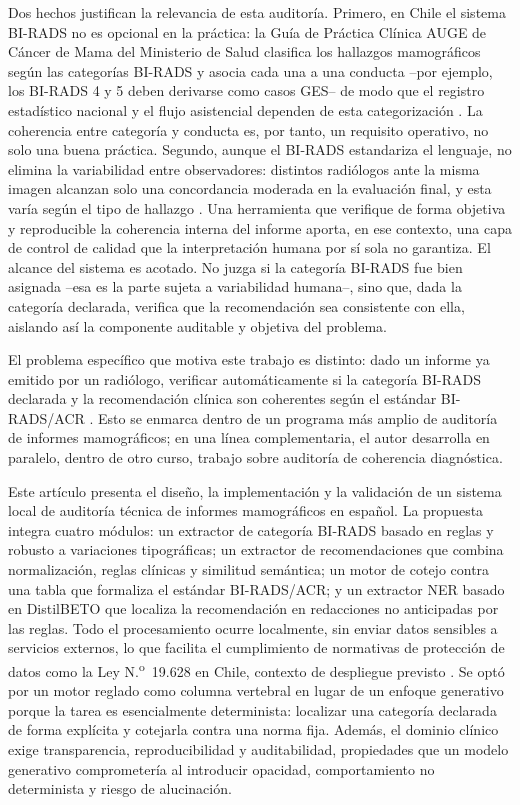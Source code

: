 \documentclass[10pt,journal,a4paper]{IEEEtran}
\begin{document}
Dos hechos justifican la relevancia de esta auditor\'ia. Primero, en Chile el sistema BI-RADS no es opcional en la pr\'actica: la Gu\'ia de Pr\'actica Cl\'inica AUGE de C\'ancer de Mama del Ministerio de Salud clasifica los hallazgos mamogr\'aficos seg\'un las categor\'ias BI-RADS y asocia cada una a una conducta --por ejemplo, los BI-RADS 4 y 5 deben derivarse como casos GES-- de modo que el registro estad\'istico nacional y el flujo asistencial dependen de esta categorizaci\'on \cite{minsal2015gpc}. La coherencia entre categor\'ia y conducta es, por tanto, un requisito operativo, no solo una buena pr\'actica. Segundo, aunque el BI-RADS estandariza el lenguaje, no elimina la variabilidad entre observadores: distintos radi\'ologos ante la misma imagen alcanzan solo una concordancia moderada en la evaluaci\'on final, y esta var\'ia seg\'un el tipo de hallazgo \cite{berg2000birads, lazarus2006birads}. Una herramienta que verifique de forma objetiva y reproducible la coherencia interna del informe aporta, en ese contexto, una capa de control de calidad que la interpretaci\'on humana por s\'i sola no garantiza. El alcance del sistema es acotado. No juzga si la categor\'ia BI-RADS fue bien asignada --esa es la parte sujeta a variabilidad humana--, sino que, dada la categor\'ia declarada, verifica que la recomendaci\'on sea consistente con ella, aislando as\'i la componente auditable y objetiva del problema.

El problema espec\'ifico que motiva este trabajo es distinto: dado un informe ya emitido por un radi\'ologo, verificar autom\'aticamente si la categor\'ia BI-RADS declarada y la recomendaci\'on cl\'inica son coherentes seg\'un el est\'andar BI-RADS/ACR \cite{acr2013}. Esto se enmarca dentro de un programa m\'as amplio de auditor\'ia de informes mamogr\'aficos; en una l\'inea complementaria, el autor desarrolla en paralelo, dentro de otro curso, trabajo sobre auditor\'ia de coherencia diagn\'ostica.

Este art\'iculo presenta el dise\~no, la implementaci\'on y la validaci\'on de un sistema local de auditor\'ia t\'ecnica de informes mamogr\'aficos en espa\~nol. La propuesta integra cuatro m\'odulos: un extractor de categor\'ia BI-RADS basado en reglas y robusto a variaciones tipogr\'aficas; un extractor de recomendaciones que combina normalizaci\'on, reglas cl\'inicas y similitud sem\'antica; un motor de cotejo contra una tabla que formaliza el est\'andar BI-RADS/ACR; y un extractor NER basado en DistilBETO que localiza la recomendaci\'on en redacciones no anticipadas por las reglas. Todo el procesamiento ocurre localmente, sin enviar datos sensibles a servicios externos, lo que facilita el cumplimiento de normativas de protecci\'on de datos como la Ley N.\textsuperscript{o}~19.628 en Chile, contexto de despliegue previsto \cite{ley19628}. Se opt\'o por un motor reglado como columna vertebral en lugar de un enfoque generativo porque la tarea es esencialmente determinista: localizar una categor\'ia declarada de forma expl\'icita y cotejarla contra una norma fija. Adem\'as, el dominio cl\'inico exige transparencia, reproducibilidad y auditabilidad, propiedades que un modelo generativo comprometer\'ia al introducir opacidad, comportamiento no determinista y riesgo de alucinaci\'on.
\end{document}
